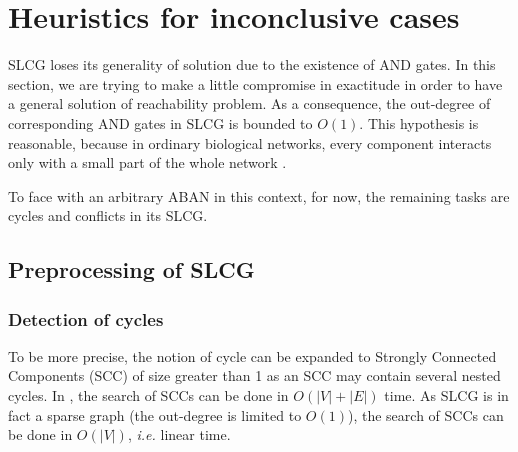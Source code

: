 \documentclass[runningheads]{llncs}
\newcommand{\acm}[3]{\{#1\}\rightarrow#3}
\begin{document}
%



\section{Heuristics for inconclusive cases}\label{sect:4}
SLCG loses its generality of solution due to the existence of AND gates.
In this section, we are trying to make a little compromise in exactitude in order to have a general solution of reachability problem. 
As a consequence, the out-degree of corresponding AND gates in SLCG is bounded to $O (1)$.
This hypothesis is reasonable, because in ordinary biological networks, every component interacts only with a small part of the whole network \cite{akutsu2007control}.

To face with an arbitrary ABAN in this context, for now, the remaining tasks are cycles and conflicts in its SLCG.
\subsection{Preprocessing of SLCG}\label{sectprecond}
\subsubsection{Detection of cycles}
To be more precise, the notion of cycle can be expanded to Strongly Connected Components (SCC) of size greater than 1 as an SCC may contain several nested cycles. 
In \cite{tarjan1972}, the search of SCCs can be done in $O (|V|+|E|)$ time. 
As SLCG is in fact a sparse graph (the out-degree is limited to $O (1)$), the search of SCCs can be done in $O (|V|)$, \textit{i.e.} linear time.
\end{document}
